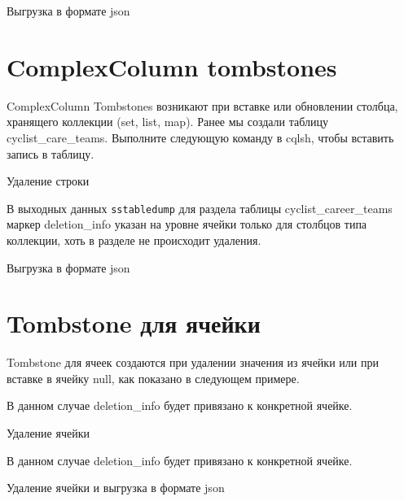 \begin{image}
	\caption{Выгрузка в формате json}
	\label{fig:sstabledump:range:delete}
\end{image}

\section{ComplexColumn tombstones}

ComplexColumn Tombstones возникают при вставке или обновлении
столбца, хранящего коллекции (set, list, map). Ранее мы создали таблицу
cyclist\_care\_teams. Выполните следующую команду в cqlsh, чтобы
вставить запись в таблицу.

\begin{image}
	\caption{Удаление строки}
	\label{fig:cqlsh:complexcolumn}
\end{image}

В выходных данных \texttt{sstabledump} для раздела таблицы
cyclist\_career\_teams маркер deletion\_info указан на уровне ячейки
только для столбцов типа коллекции, хоть в разделе не происходит удаления.

\begin{image}
	\caption{Выгрузка в формате json}
	\label{fig:sstabledump:complexcolumn}
\end{image}

\section{Tombstone для ячейки}

Tombstone для ячеек создаются при удалении значения из ячейки или при
вставке в ячейку null, как показано в следующем примере.\par
В данном случае deletion\_info будет привязано к конкретной ячейке.

\begin{image}
	\caption{Удаление ячейки }
	\label{fig:cqlsh-sstabledump:complexcolumn:sql}
\end{image}

В данном случае deletion\_info будет привязано к конкретной ячейке.

\begin{image}
	\caption{Удаление ячейки и выгрузка в формате json}
	\label{fig:cqlsh-sstabledump:complexcolumn}
\end{image}

